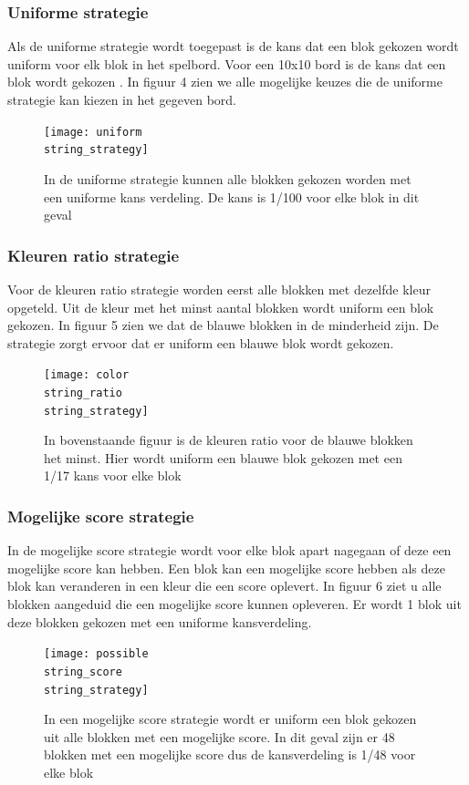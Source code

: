 \documentclass[12pt,a4paper,oneside]{book}
\begin{document}
\subsubsection{Uniforme strategie}
Als de uniforme strategie wordt toegepast is de kans dat een blok gekozen wordt uniform voor elk blok in het spelbord. Voor een 10x10 bord is de kans dat een blok wordt gekozen . In figuur 4 zien we alle mogelijke keuzes die de uniforme strategie kan kiezen in het gegeven bord.
\begin{figure}
	\centering
	\texttt{[image: uniform\\string\_strategy]}
	\caption{In de uniforme strategie kunnen alle blokken gekozen worden met een uniforme kans verdeling. De kans is 1/100 voor elke blok in dit geval}
	\label{figure:initialboard}
\end{figure}

\subsubsection{Kleuren ratio strategie}
Voor de kleuren ratio strategie worden eerst alle blokken met dezelfde kleur opgeteld. Uit de kleur met het minst aantal blokken wordt uniform een blok gekozen. In figuur 5 zien we dat de blauwe blokken in de minderheid zijn. De strategie zorgt ervoor dat er uniform een blauwe blok wordt gekozen.
\begin{figure}
	\centering
	\texttt{[image: color\\string\_ratio\\string\_strategy]}
	\caption{In bovenstaande figuur is de kleuren ratio voor de blauwe blokken het minst. Hier wordt uniform een blauwe blok gekozen met een 1/17 kans voor elke blok}
	\label{figure:initialboard}
\end{figure}

\subsubsection{Mogelijke score strategie}
In de mogelijke score strategie wordt voor elke blok apart nagegaan of deze een mogelijke score kan hebben. Een blok kan een mogelijke score hebben als deze blok kan veranderen in een kleur die een score oplevert. In figuur 6 ziet u alle blokken aangeduid die een mogelijke score kunnen opleveren. Er wordt 1 blok uit deze blokken gekozen met een uniforme kansverdeling.
\begin{figure}
	\centering
	\texttt{[image: possible\\string\_score\\string\_strategy]}
	\caption{In een mogelijke score strategie wordt er uniform een blok gekozen uit alle blokken met een mogelijke score. In dit geval zijn er 48 blokken met een mogelijke score dus de kansverdeling is 1/48 voor elke blok}
	\label{figure:initialboard}
\end{figure}
\end{document}
